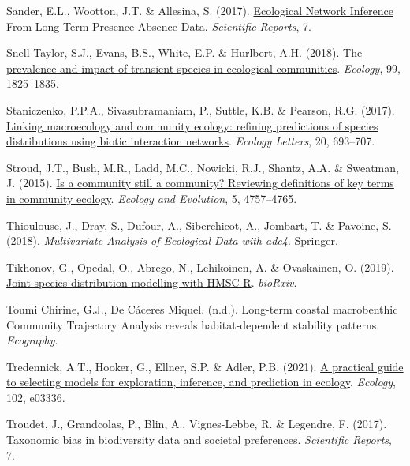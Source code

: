 \documentclass[9pt,biorxiv,doublespacing,lineno]{lapreprint}
\newlength{\cslhangindent}
\newlength{\cslentryspacingunit} %
\newenvironment{CSLReferences}[2] %
 {%
  \setlength{\parindent}{0pt}
  \ifodd #1
  \let\oldpar\par
  \def\par{\hangindent=\cslhangindent\oldpar}
  \fi
  \setlength{\parskip}{#2\cslentryspacingunit}
 }%
 {}
\begin{document}
\begin{CSLReferences}{1}{0}
\leavevmode{}%
Sander, E.L., Wootton, J.T. \& Allesina, S. (2017).
\href{https://doi.org/10.1038/s41598-017-07009-x}{Ecological Network
Inference From Long-Term Presence-Absence Data}. \emph{Scientific
Reports}, 7.

\leavevmode{}%
Snell Taylor, S.J., Evans, B.S., White, E.P. \& Hurlbert, A.H. (2018).
\href{https://doi.org/10.1002/ecy.2398}{The prevalence and impact of
transient species in ecological communities}. \emph{Ecology}, 99,
1825--1835.

\leavevmode{}%
Staniczenko, P.P.A., Sivasubramaniam, P., Suttle, K.B. \& Pearson, R.G.
(2017). \href{https://doi.org/10.1111/ele.12770}{Linking macroecology
and community ecology: refining predictions of species distributions
using biotic interaction networks}. \emph{Ecology Letters}, 20,
693--707.

\leavevmode{}%
Stroud, J.T., Bush, M.R., Ladd, M.C., Nowicki, R.J., Shantz, A.A. \&
Sweatman, J. (2015). \href{https://doi.org/10.1002/ece3.1651}{Is a
community still a community? Reviewing definitions of key terms in
community ecology}. \emph{Ecology and Evolution}, 5, 4757--4765.

\leavevmode{}%
Thioulouse, J., Dray, S., Dufour, A., Siberchicot, A., Jombart, T. \&
Pavoine, S. (2018).
\emph{\href{https://doi.org/10.1007/978-1-4939-8850-1}{Multivariate
Analysis of Ecological Data with ade4}}. Springer.

\leavevmode{}%
Tikhonov, G., Opedal, O., Abrego, N., Lehikoinen, A. \& Ovaskainen, O.
(2019). \href{https://doi.org/10.1101/603217}{Joint species distribution
modelling with HMSC-R}. \emph{bioRxiv}.

\leavevmode{}%
Toumi Chirine, G.J., De Cáceres Miquel. (n.d.). Long-term coastal
macrobenthic Community Trajectory Analysis reveals habitat-dependent
stability patterns. \emph{Ecography}.

\leavevmode{}%
Tredennick, A.T., Hooker, G., Ellner, S.P. \& Adler, P.B. (2021).
\href{https://doi.org/10.1002/ecy.3336}{A practical guide to selecting
models for exploration, inference, and prediction in ecology}.
\emph{Ecology}, 102, e03336.

\leavevmode{}%
Troudet, J., Grandcolas, P., Blin, A., Vignes-Lebbe, R. \& Legendre, F.
(2017). \href{https://doi.org/10.1038/s41598-017-09084-6}{Taxonomic bias
in biodiversity data and societal preferences}. \emph{Scientific
Reports}, 7.


\end{CSLReferences}
\end{document}

